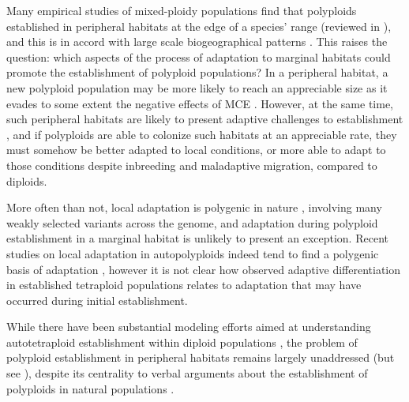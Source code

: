 \documentclass[12pt,a4paper]{article}
\begin{document}
    Many empirical studies of mixed-ploidy populations find that polyploids
    established in peripheral habitats at the edge of a species' range (reviewed in
    \cite{griswold2021}), and this is in accord with large scale biogeographical
    patterns \citep{rice2019}.
    This raises the question: which aspects of the process of adaptation to marginal
    habitats could promote the establishment of polyploid populations?
    In a peripheral habitat, a new polyploid population may be more likely to reach
    an appreciable size as it evades to some extent the negative effects of MCE
    \citep{levin1975}.
    However, at the same time, such peripheral habitats are likely to present
    adaptive challenges to establishment
    \citep{kawecki2008adaptation,sachdeva2022b}, and if polyploids are able to
    colonize such habitats at an appreciable rate, they must somehow be better
    adapted to local conditions, or more able to adapt to those conditions despite
    inbreeding and maladaptive migration, compared to diploids.

    More often than not, local adaptation is polygenic in nature
    \citep{pritchard2010,barghi2020,bomblies2022}, involving many weakly selected
    variants across the genome, and adaptation during polyploid establishment
    in a marginal habitat is unlikely to present an exception.
    Recent studies on local adaptation in autopolyploids indeed tend to find a
    polygenic basis of adaptation \citep{bohutinska2021,konevcna2021,konevcna2022},
    however it is not clear how observed adaptive differentiation in established
    tetraploid populations relates to adaptation that may have occurred during
    initial establishment.

    While there have been substantial modeling efforts aimed at understanding
    autotetraploid establishment within diploid populations \citep{levin1975,
    felber1991, felber1997, rausch2005, oswald2011, clo2022c}, the problem of
    polyploid establishment in peripheral habitats remains largely unaddressed
    (but see \cite{griswold2021}),
    despite its centrality to verbal arguments about the establishment of
    polyploids in natural populations \citep{kolar2017, vandepeer2021, clo2022d}.
\end{document}
